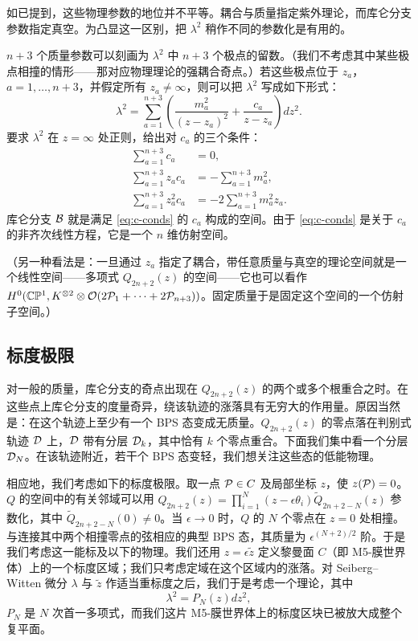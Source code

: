如已提到，这些物理参数的地位并不平等。耦合与质量指定紫外理论，而库仑分支参数指定真空。为凸显这一区别，把 $\lambda^2$ 稍作不同的参数化是有用的。

$n+3$ 个质量参数可以刻画为 $\lambda^2$ 中 $n+3$ 个极点的留数。（我们不考虑其中某些极点相撞的情形——那对应物理理论的强耦合奇点。）若这些极点位于 $z_a$，$a = 1, \dots, n+3$，并假定所有 $z_a \neq \infty$，则可以把 $\lambda^2$ 写成如下形式：
\begin{equation}\label{eq:part-frac}
\lambda^2 = \sum_{a=1}^{n+3} \left(
\frac{m_a^2}{(z-z_a)^2} + \frac{c_a}{z-z_a}\right) dz^{2}.
\end{equation}
要求 $\lambda^2$ 在 $z = \infty$ 处正则，给出对 $c_a$ 的三个条件：
\begin{equation}\label{eq:c-conds}
\begin{aligned}
\sum_{a=1}^{n+3} c_a & = 0, \\
\sum_{a=1}^{n+3} z_a c_a & =   - \sum_{a=1}^{n+3} m_a^2, \\
\sum_{a=1}^{n+3} z_a^2 c_a & =   - 2\sum_{a=1}^{n+3} m_a^2 z_a.
\end{aligned}
\end{equation}
库仑分支 $\mathcal{B}$ 就是满足 \eqref{eq:c-conds} 的 $c_a$ 构成的空间。由于 \eqref{eq:c-conds} 是关于 $c_a$ 的非齐次线性方程，它是一个 $n$ 维仿射空间。

（另一种看法是：一旦通过 $z_a$ 指定了耦合，带任意质量与真空的理论空间就是一个线性空间——多项式 $Q_{2n+2}(z)$ 的空间——它也可以看作 $H^0(\mathbb{C} \mathbb{P}^1, K^{\otimes 2} \otimes \mathcal{O}(2\mathcal{P}_1 + \cdots + 2\mathcal{P}_{n+3}) )$。固定质量于是固定这个空间的一个仿射子空间。）

\subsection{标度极限}

对一般的质量，库仑分支的奇点出现在 $Q_{2n+2}(z)$ 的两个或多个根重合之时。在这些点上库仑分支的度量奇异，绕该轨迹的涨落具有无穷大的作用量。原因当然是：在这个轨迹上至少有一个 BPS 态变成无质量。$Q_{2n+2}(z)$ 的零点落在判别式轨迹 $\mathcal{D}$ 上，$\mathcal{D}$ 带有分层 $\mathcal{D}_k$，其中恰有 $k$ 个零点重合。下面我们集中看一个分层 $\mathcal{D}_N$。在该轨迹附近，若干个 BPS 态变轻，我们想关注这些态的低能物理。

相应地，我们考虑如下的标度极限。取一点 $\mathcal{P} \in C$ 及局部坐标 $z$，使 $z(\mathcal{P}) = 0$。$Q$ 的空间中的有关邻域可以用 $Q_{2n+2}(z) = \prod_{i=1}^N (z - \epsilon \theta_i) \tilde Q_{2n+2-N}(z)$ 参数化，其中 $\tilde Q_{2n+2-N}(0) \not= 0$。当 $\epsilon \to 0$ 时，$Q$ 的 $N$ 个零点在 $z = 0$ 处相撞。与连接其中两个相撞零点的弦相应的典型 BPS 态，其质量为 $\epsilon^{(N+2)/2}$ 阶。于是我们考虑这一能标及以下的物理。我们还用 $z = \epsilon \tilde z$ 定义黎曼面 $C$（即 M5-膜世界体）上的一个标度区域；我们只考虑定域在这个区域内的涨落。对 Seiberg–Witten 微分 $\lambda$ 与 $\tilde z$ 作适当重标度之后，我们于是考虑一个理论，其中
\begin{equation}\label{eq:PolyDegen}
\lambda^2 = P_N(z) dz^2,
\end{equation}
$P_N$ 是 $N$ 次首一多项式，而我们这片 M5-膜世界体上的标度区块已被放大成整个复平面。


